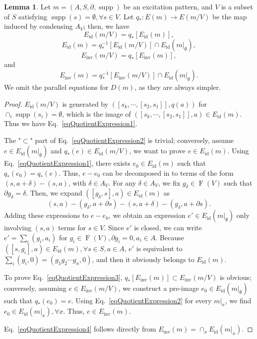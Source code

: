 \documentclass[reprint, amsmath, amssymb, showpacs, floatfix, longbibliography, aps, twocolumn, superscriptaddress, nofootinbib]{revtex4-2}
\newcommand{\supp}{\operatorname{supp}}
\newcommand{\id}{{\operatorname{id}}}
\newcommand{\inv}{{\operatorname{inv}}}
\theoremstyle{definition}
\newtheorem{lemma}{Lemma}[section]
\begin{document}
\begin{lemma}\label{lemmaQuotientLifting}
	Let $m=(A,S,\partial,\supp)$ be an excitation pattern, and $V$ is a subset of $S$ satisfying $\supp(s)=\emptyset, \forall s\in V$. Let $q_*:E(m)\rightarrow E(m/V)$ be the map induced by condensing $A_V$; then, we have
	\begin{equation}\label{eqQuotientExpression1}
		E_\id(m/V)=q_*[E_\id(m)],
	\end{equation}
	\begin{equation}\label{eqQuotientExpression2}
		E_\id(m)=q_*^{-1}[E_\id(m/V)]\cap E_\id(m|_\emptyset),
	\end{equation}
	\begin{equation}\label{eqQuotientExpression3}
		E_\inv(m/V)=q_*[E_\inv(m)],
	\end{equation}
	and
	\begin{equation}\label{eqQuotientExpression4}
		E_\inv(m)=q_*^{-1}[E_\inv(m/V)]\cap E_\id(m|_\emptyset).
	\end{equation}
	We omit the parallel equations for $D(m)$, as they are always simpler.
\end{lemma}
\begin{proof}
	$E_\id(m/V)$ is generated by $([s_k,\cdots,[s_2,s_1]],q(a))$ for $\cap_i\supp(s_i)=\emptyset$, which is the image of $([s_k,\cdots,[s_2,s_1]],a)\in E_\id(m)$. Thus we have Eq.~\eqref{eqQuotientExpression1}.
	
	The "$\subset$" part of Eq.~\eqref{eqQuotientExpression2} is trivial; conversely, assume $e\in E_\id(m|_\emptyset)$ and $q_*(e)\in E_\id(m/V)$, we want to prove $e\in E_\id(m)$. Using Eq.~\eqref{eqQuotientExpression1}, there exists $e_0\in E_\id(m)$ such that $q_*(e_0)=q_*(e)$. Thus, $e-e_0$ can be decomposed in to terms of the form $(s,a+\delta)-(s,a)$, with $\delta\in A_V$. For any $\delta\in A_V$, we fix $g_\delta\in \operatorname{F}(V)$ such that $\partial g_\delta=\delta$. Then, we expand $([g_\delta,s],a)\in E_\id(m)$ as
	\begin{equation}
		(s,a)-(g_\delta,a+\partial s)-(s,a+\delta)-(g_\delta,a+\partial s).
	\end{equation} 
	Adding these expressions to $e-e_0$, we obtain an expression $e'\in E_\id(m|_\emptyset)$ only involving $(s,a)$ terms for $s\in V$.  Since $e'$ is closed, we can write $e'=\sum_i (g_i,a_i)$ for $g_i\in \operatorname{F}(V),\partial g_i=0, a_i\in A$. Because $([s,g_i],a)\in E_{\operatorname{id}}(m),\forall s\in S, a\in A$, $e'$ is equivalent to $\sum_i (g_i,0)=(g_1g_2\cdots g_n,0)$, and then it obviously belongs to $E_\id(m)$.
	
	To prove Eq.~\eqref{eqQuotientExpression3}, $q_*[E_\inv(m)]\subset E_\inv(m/V)$ is obvious; conversely, assuming $e\in E_\inv(m/V)$, we construct a pre-image $e_0\in E_\id(m|_\emptyset)$ such that $q_*(e_0)=e$. Using Eq.~\eqref{eqQuotientExpression2} for every $m|_x$, we find $e_0\in E_\id(m|_x),\forall x$. Thus, $e\in E_\inv(m)$.
	
	Eq.~\eqref{eqQuotientExpression4} follows directly from $E_\inv(m)=\cap_x E_\id(m|_x)$.
\end{proof}
\end{document}
